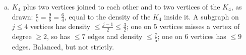 \begin{eg}
\begin{enumerate}[(a)]
        \item \(K_4\) plus two vertices joined to each other and to two vertices of the \(K_4\), as drawn: \(\frac{e}{v} = \frac{9}{6} = \frac{6}{4}\), equal to the density of the \(K_4\) inside it. A subgraph on \(j \le 4\) vertices has density \(\le \frac{j-1}{2} \le \frac{3}{2}\); one on \(5\) vertices misses a vertex of degree \(\ge 2\), so has \(\le 7\) edges and density \(\le \frac{7}{5}\); one on \(6\) vertices has \(\le 9\) edges. Balanced, but not strictly.
    \end{enumerate}
\end{eg}
